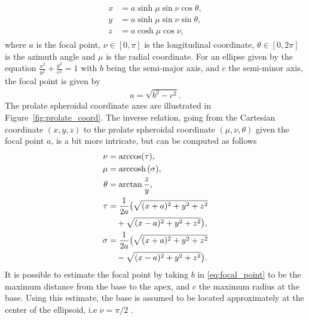 \begin{align}
  \begin{split}
    x &= a \sinh \mu \sin \nu \cos \theta,  \\
    y &= a \sinh \mu \sin \nu \sin \theta,  \\
    z &= a \cosh \mu \cos \nu,
  \end{split}
\end{align}
where $a$ is the focal point, $\nu \in [0, \pi]$ is the longitudinal
coordinate, $\theta \in [0, 2\pi]$ is the azimuth angle and $\mu$
is the radial coordinate. For an ellipse given by the equation
$\frac{x^2}{b^2} +\frac{y^2}{c^2}  = 1$ with $b$ being the semi-major
axis, and $c$ the semi-minor axis, the focal point is given by
\begin{align}
  a =\sqrt{b^2 - c^2}.
  \label{eq:focal_point}
\end{align}
The prolate spheroidal coordinate axes are illustrated in
Figure~\ref{fig:prolate_coord}. The inverse relation, going from the
Cartesian coordinate $(x,y,z)$ to the prolate spheroidal coordinate
$(\mu, \nu, \theta)$ given the focal point $a$, is a bit more
intricate, but can be computed as follows 
\begin{align}
  \begin{split}
    \nu &= \arccos (\tau), \\
    \mu &= \mathrm{arccosh} \hspace{0.05cm} (\sigma), \\
    \theta &= \arctan \frac{z}{y}, \\
    \tau &= \frac{1}{2a} \big( \sqrt{(x + a)^2 + y^2 + z^2} \\
    & \quad + \sqrt{(x - a)^2 + y^2 + z^2} \big), \\
    \sigma &= \frac{1}{2a} \big( \sqrt{(x + a)^2 + y^2 + z^2}\\
    & \quad - \sqrt{(x - a)^2 + y^2 + z^2}\big). 
  \end{split}
\end{align}
It is possible to estimate the focal point by taking $b$ in
\eqref{eq:focal_point} to be the maximum distance from the base to the
apex, and $c$ the maximum radius at the base. Using this estimate,
the base is assumed to be located approximately at the center of the
ellipsoid, i.e $\nu = \pi / 2$ \cite{land2015verification}.
